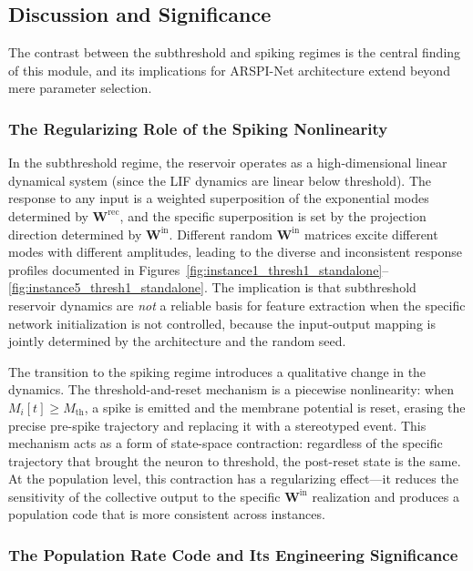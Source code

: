 \subsection{Discussion and Significance}
\label{sec:module2_discussion}

The contrast between the subthreshold and spiking regimes is the central finding of this module, and its implications for ARSPI-Net architecture extend beyond mere parameter selection.

\subsubsection{The Regularizing Role of the Spiking Nonlinearity}

In the subthreshold regime, the reservoir operates as a high-dimensional linear dynamical system (since the LIF dynamics are linear below threshold). The response to any input is a weighted superposition of the exponential modes determined by $\mathbf{W}^{\text{rec}}$, and the specific superposition is set by the projection direction determined by $\mathbf{W}^{\text{in}}$. Different random $\mathbf{W}^{\text{in}}$ matrices excite different modes with different amplitudes, leading to the diverse and inconsistent response profiles documented in Figures~\ref{fig:instance1_thresh1_standalone}--\ref{fig:instance5_thresh1_standalone}. The implication is that subthreshold reservoir dynamics are \emph{not} a reliable basis for feature extraction when the specific network initialization is not controlled, because the input-output mapping is jointly determined by the architecture and the random seed.

The transition to the spiking regime introduces a qualitative change in the dynamics. The threshold-and-reset mechanism is a piecewise nonlinearity: when $M_i[t] \geq M_{\text{th}}$, a spike is emitted and the membrane potential is reset, erasing the precise pre-spike trajectory and replacing it with a stereotyped event. This mechanism acts as a form of state-space contraction: regardless of the specific trajectory that brought the neuron to threshold, the post-reset state is the same. At the population level, this contraction has a regularizing effect---it reduces the sensitivity of the collective output to the specific $\mathbf{W}^{\text{in}}$ realization and produces a population code that is more consistent across instances.

\subsubsection{The Population Rate Code and Its Engineering Significance}

